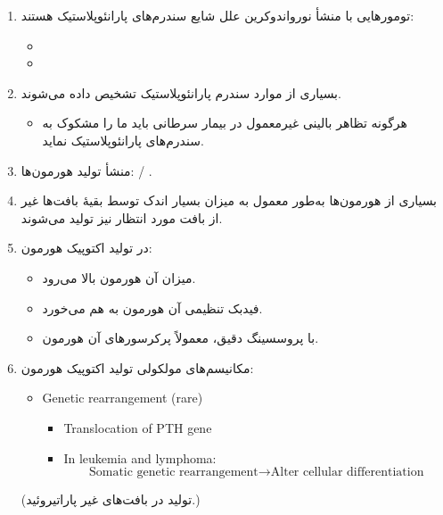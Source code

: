 \documentclass[a4paper,12pt]{article}
\begin{document}
\begin{enumerate}[label=\arabic*.,start=1]
\item تومورهایی با منشأ نورواندوکرین علل شایع سندرم‌های پارانئوپلاستیک هستند:
\begin{itemize}
\item {}
\item {}
\end{itemize}
\item بسیاری از موارد سندرم پارانئوپلاستیک تشخیص داده می‌شوند.
\begin{itemize}
\item هرگونه تظاهر بالینی غیرمعمول در بیمار سرطانی باید ما را مشکوک به سندرم‌های پارانئوپلاستیک نماید.
\end{itemize}
\item منشأ تولید هورمون‌ها:  / .
\item بسیاری از هورمون‌ها به‌طور معمول به میزان بسیار اندک توسط بقیهٔ بافت‌ها غیر از بافت مورد انتظار نیز تولید می‌شوند.
\item در تولید اکتوپیک هورمون:
\begin{itemize}
\item میزان آن هورمون بالا می‌رود.
\item فیدبک تنظیمی آن هورمون به هم می‌خورد.
\item با پروسسینگ دقیق، معمولاً پرکرسورهای آن هورمون.
\end{itemize}
\item مکانیسم‌های مولکولی تولید اکتوپیک هورمون:
\begin{latin}
\begin{itemize}
\item[a)] Genetic rearrangement (rare)
\begin{itemize}
\item Translocation of PTH gene
\item In leukemia and lymphoma:
\[\text{Somatic genetic rearrangement}\longrightarrow\text{Alter cellular differentiation}\]
\end{itemize}
\end{itemize}
\end{latin}
(تولید  در بافت‌های غیر پاراتیروئید.)
\end{enumerate}
\end{document}
